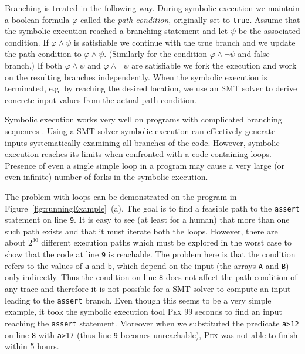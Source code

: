 \documentclass{llncs}
\newcommand{\Pex}{\textsc{Pex}\xspace}
\renewcommand{\phi}{\varphi}
\begin{document}
Branching is treated in the following way. During symbolic execution we
maintain a boolean formula $\phi$ called the \emph{path condition},
originally set to \texttt{true}. Assume that the symbolic execution reached a
branching statement and let $\psi$ be the associated condition. If
$\phi\wedge\psi$ is satisfiable we continue with the true branch and we
update the path condition to $\phi\wedge\psi$. (Similarly for the condition
$\phi\wedge\neg\psi$ and false branch.) If both $\phi\wedge\psi$ and
$\phi\wedge\neg\psi$ are satisfiable we fork the execution and work on the
resulting branches independently. When the symbolic execution is terminated,
e.g. by reaching the desired location, we use an SMT solver to derive concrete
input values from the actual path condition.

Symbolic execution works very well on programs with complicated branching
sequences \cite{Cadar08,TdH08,Pex}. Using a SMT solver symbolic execution can
effectively generate inputs systematically examining all branches of the
code. However, symbolic execution reaches its limits when confronted with a
code containing loops. Presence of even a single simple loop in a program
may cause a very large (or even infinite) number of forks in the symbolic
execution.

The problem with loops can be demonstrated on the program in
Figure~\ref{fig:runningExample}~(a). The goal is to find a feasible path to
the \texttt{assert} statement on line \texttt{9}. It is easy to see (at
least for a human) that more than one such path exists and that it must
iterate both the loops. However, there are about $2^{30}$ different execution
paths which must be explored in the worst case to show that  the code at line
\texttt{9} is reachable. The problem here is that the condition refers
 to the values of \texttt{a} and \texttt{b}, which depend on the input (the
 arrays \texttt{A} and \texttt{B}) only indirectly. Thus the condition on
 line \texttt{8} does not affect the path condition of any trace and
 therefore it is not possible for a SMT solver to compute an input leading to
 the \texttt{assert} branch. Even though this seems to be a very simple example,
it took the symbolic execution tool \Pex 99 seconds to find an
input reaching the \texttt{assert} statement. Moreover when we substituted the
predicate \texttt{a>12} on line \texttt{8} with \texttt{a>17} (thus line
\texttt{9} becomes unreachable), \Pex
was not able to finish within 5 hours.
\end{document}
